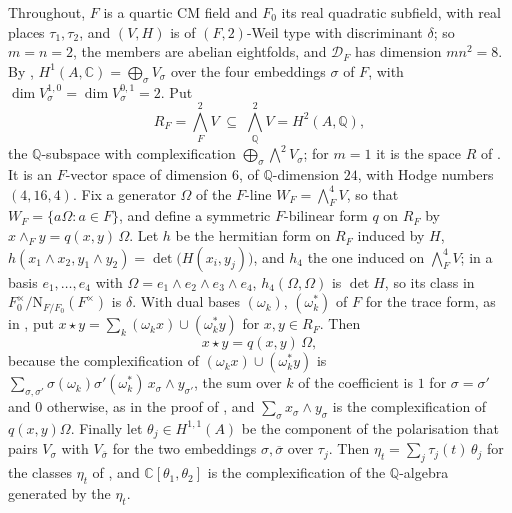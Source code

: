 \documentclass[11pt,reqno]{amsart}
\theoremstyle{plain}
\theoremstyle{definition}
\theoremstyle{remark}
\newcommand{\QQ}{\mathbb{Q}}
\newcommand{\CC}{\mathbb{C}}
\newcommand{\cD}{\mathcal{D}}
\newcommand{\Nm}{\mathrm{N}}             %
\newcommand{\bbar}[1]{\overline{#1}}
\begin{document}
Throughout, $F$ is a quartic CM field and $F_{0}$ its real quadratic subfield,
with real places $\tau_{1},\tau_{2}$, and $(V,H)$ is of $(F,2)$-Weil type with
discriminant $\delta$; so $m=n=2$, the members are abelian eightfolds, and
$\cD_{F}$ has dimension $mn^{2}=8$. By \cite[Proposition~17.3(i)]{paperI},
$H^{1}(A,\CC)=\bigoplus_{\sigma}V_{\sigma}$ over the four embeddings $\sigma$ of
$F$, with $\dim V_{\sigma}^{1,0}=\dim V_{\sigma}^{0,1}=2$. Put
\[
  R_{F}=\textstyle\bigwedge^{2}_{F}V\;\subseteq\;\bigwedge^{2}_{\QQ}V=H^{2}(A,\QQ),
\]
the $\QQ$-subspace with complexification
$\bigoplus_{\sigma}\bigwedge^{2}V_{\sigma}$; for $m=1$ it is the space $R$ of
\cite[Proposition~15.18]{paperI}. It is an $F$-vector space of dimension $6$, of
$\QQ$-dimension $24$, with Hodge numbers $(4,16,4)$. Fix a generator $\Omega$
of the $F$-line $W_{F}=\bigwedge^{4}_{F}V$, so that
$W_{F}=\{a\Omega:a\in F\}$, and define a symmetric $F$-bilinear form $q$ on
$R_{F}$ by $x\wedge_{F}y=q(x,y)\,\Omega$. Let $h$ be the hermitian form on
$R_{F}$ induced by $H$, $h(x_{1}\wedge x_{2},y_{1}\wedge y_{2})
=\det\bigl(H(x_{i},y_{j})\bigr)$, and $h_{4}$ the one induced on
$\bigwedge^{4}_{F}V$; in a basis $e_{1},\dots,e_{4}$ with
$\Omega=e_{1}\wedge e_{2}\wedge e_{3}\wedge e_{4}$, $h_{4}(\Omega,\Omega)$ is
$\det H$, so its class in $F_{0}^{\times}/\Nm_{F/F_{0}}(F^{\times})$ is
$\delta$. With dual bases $(\omega_{k})$, $(\omega_{k}^{*})$ of $F$ for the
trace form, as in \cite[Theorem~17.5]{paperI}, put
$x\star y=\sum_{k}(\omega_{k}x)\cup(\omega_{k}^{*}y)$ for $x,y\in R_{F}$. Then
\begin{equation}\label{eq:quarticstar}
  x\star y=q(x,y)\,\Omega ,
\end{equation}
because the complexification of $(\omega_{k}x)\cup(\omega_{k}^{*}y)$ is
$\sum_{\sigma,\sigma'}\sigma(\omega_{k})\sigma'(\omega_{k}^{*})\,
x_{\sigma}\wedge y_{\sigma'}$, the sum over $k$ of the coefficient is $1$ for
$\sigma=\sigma'$ and $0$ otherwise, as in the proof of
\cite[Theorem~17.5(ii)]{paperI}, and $\sum_{\sigma}x_{\sigma}\wedge y_{\sigma}$ is
the complexification of $q(x,y)\Omega$. Finally let $\theta_{j}\in H^{1,1}(A)$
be the component of the polarisation that pairs $V_{\sigma}$ with
$V_{\bbar\sigma}$ for the two embeddings $\sigma,\bbar\sigma$ over $\tau_{j}$.
Then $\eta_{t}=\sum_{j}\tau_{j}(t)\,\theta_{j}$ for the classes $\eta_{t}$ of
\cite[Proposition~17.3(iii)]{paperI}, and $\CC[\theta_{1},\theta_{2}]$ is the
complexification of the $\QQ$-algebra generated by the $\eta_{t}$.
\end{document}
